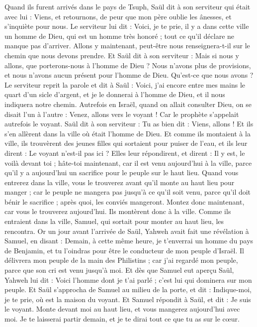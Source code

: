 \begin{multicols}{2}
Quand ils furent arrivés dans le pays de Tsuph, Saül dit à son serviteur qui était avec lui : Viens, et retournons, de peur que mon père oublie les ânesses, et s'inquiète pour nous.
Le serviteur lui dit : Voici, je te prie, il y a dans cette ville un homme de Dieu, qui est un homme très honoré ; tout ce qu'il déclare ne manque pas d'arriver. Allons y maintenant, peut-être nous renseignera-t-il sur le chemin que nous devons prendre.
Et Saül dit à son serviteur : Mais si nous y allons, que porterons-nous à l'homme de Dieu ? Nous n'avons plus de provisions, et nous n'avons aucun présent pour l'homme de Dieu. Qu'est-ce que nous avons ?
Le serviteur reprit la parole et dit à Saül : Voici, j'ai encore entre mes mains le quart d'un sicle d'argent, et je le donnerai à l'homme de Dieu, et il nous indiquera notre chemin.
Autrefois en Israël, quand on allait consulter Dieu, on se disait l'un à l'autre : Venez, allons vers le voyant ! Car le prophète s'appelait autrefois le voyant.
Saül dit à son serviteur : Tu as bien dit : Viens, allons ! Et ils s'en allèrent dans la ville où était l'homme de Dieu.
Et comme ils montaient à la ville, ils trouvèrent des jeunes filles qui sortaient pour puiser de l'eau, et ils leur dirent : Le voyant n'est-il pas ici ?
Elles leur répondirent, et dirent : Il y est, le voilà devant toi ; hâte-toi maintenant, car il est venu aujourd'hui à la ville, parce qu'il y a aujourd'hui un sacrifice pour le peuple sur le haut lieu.
Quand vous entrerez dans la ville, vous le trouverez avant qu'il monte au haut lieu pour manger ; car le peuple ne mangera pas jusqu'à ce qu'il soit venu, parce qu'il doit bénir le sacrifice ; après quoi, les conviés mangeront. Montez donc maintenant, car vous le trouverez aujourd'hui.
Ils montèrent donc à la ville. Comme ils entraient dans la ville, Samuel, qui sortait pour monter au haut lieu, les rencontra.
Or un jour avant l'arrivée de Saül, Yahweh avait fait une révélation à Samuel, en disant :
Demain, à cette même heure, je t'enverrai un homme du pays de Benjamin, et tu l'oindras pour être le conducteur de mon peuple d'Israël. Il délivrera mon peuple de la main des Philistins ; car j'ai regardé mon peuple, parce que son cri est venu jusqu'à moi.
Et dès que Samuel eut aperçu Saül, Yahweh lui dit : Voici l'homme dont je t'ai parlé ; c'est lui qui dominera sur mon peuple.
Et Saül s'approcha de Samuel au milieu de la porte, et dit : Indique-moi, je te prie, où est la maison du voyant.
Et Samuel répondit à Saül, et dit : Je suis le voyant. Monte devant moi au haut lieu, et vous mangerez aujourd'hui avec moi. Je te laisserai partir demain, et je te dirai tout ce que tu as sur le cœur.

\end{multicols}
